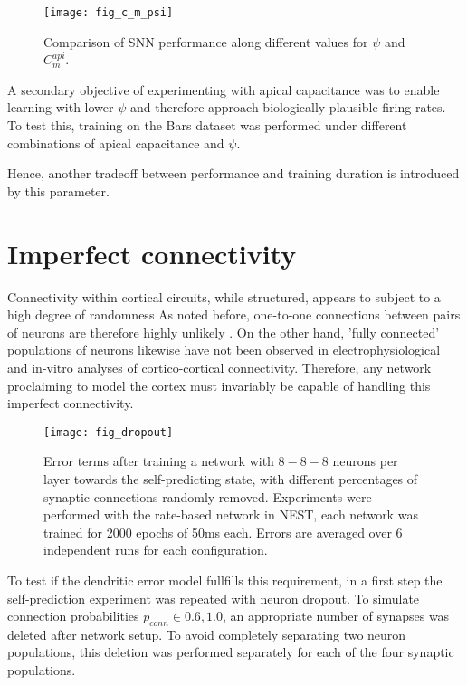 \begin{figure}[h]
    \centering
    \texttt{[image: fig\_c\_m\_psi]}
    \caption{Comparison of SNN performance along different values for $\psi$ and $C_m^{api}$.}
    \label{fig-c-m-psi}
\end{figure}

A secondary objective of experimenting with apical capacitance was to enable learning with lower $\psi$ and therefore
approach biologically plausible firing rates. To test this, training on the Bars dataset was performed under different
combinations of apical capacitance and $\psi$. 



Hence, another tradeoff between performance and training duration is introduced by this parameter.


\section{Imperfect connectivity}

Connectivity within cortical circuits, while structured, appears to subject to a high degree of randomness
\citep{potjans2014cell} As noted before, one-to-one connections between pairs of neurons are therefore highly unlikely
\citep{whittington2019theories}. On the other hand, 'fully connected' populations of neurons likewise have not been
observed in electrophysiological \citep{thomson2002synaptic} and in-vitro \citep{binzegger2004quantitative} analyses of
cortico-cortical connectivity. Therefore, any network proclaiming to model the cortex must invariably be capable of
handling this imperfect connectivity.

\begin{figure}[h]
    \centering
    \texttt{[image: fig\_dropout]}
    \caption{Error terms after training a network with $8-8-8$ neurons per layer towards the self-predicting state, with
        different percentages of synaptic connections randomly removed. Experiments were performed with the rate-based
        network in NEST, each network was trained for 2000 epochs of 50ms each. Errors are averaged over 6 independent
        runs for each configuration.}
    \label{fig-dropout}
\end{figure}

To test if the dendritic error model fullfills this requirement, in a first step the self-prediction experiment was
repeated with neuron dropout. To simulate connection probabilities $p_{conn} \in {0.6, 1.0}$, an appropriate number of
synapses was deleted after network setup. To avoid completely separating two neuron populations, this deletion was
performed separately for each of the four synaptic populations.

